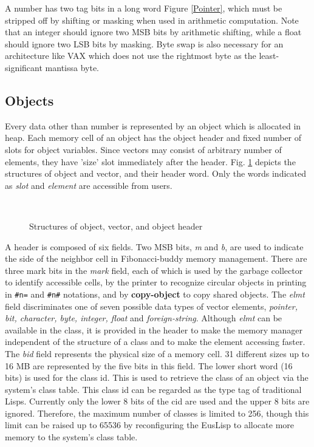 A number has two tag bits in a long word {Figure \ref{Pointer}},
which must be stripped off by shifting or masking 
when used in arithmetic computation.
Note that an integer should ignore two MSB bits by arithmetic shifting,
while a float should ignore two LSB bits by masking.
Byte swap is also necessary for an architecture like VAX which does not use
the rightmost byte as the least-significant mantissa byte.


\subsection{Objects}
Every data  other than number is represented by an object which is allocated
in heap. 
Each memory cell of an object has the object header and fixed number of 
slots for object variables.
Since vectors may consist of arbitrary number of elements,
they have 'size' slot immediately after the header.
Fig. \ref{ObjectFig} depicts the structures of object and vector, and their
header word.
Only the words indicated as {\em slot} and {\em element}
are accessible from users.

\begin{figure}[hbt]
\begin{center}
\mbox{
\epsfxsize=10cm
}
\end{center}
\caption{\label{ObjectFig}Structures of object, vector, and object header}
\end{figure}

A header is composed of six fields.
Two MSB bits, {\em m} and {\em b},
are used to indicate the side of the neighbor cell
in Fibonacci-buddy memory management.
There are three mark bits in the {\em mark} field, each of which
is used by the garbage collector to identify accessible cells,
by the printer to recognize circular objects in printing in {\tt \#n=} and
{\tt \#n\#} notations,
and by {\bf copy-object} to copy shared objects.
The {\em elmt} field discriminates one of seven possible data types
of vector elements, {\em pointer, bit, character, byte, integer, float}
and {\em foreign-string}.
Although {\em elmt} can be available in the class, 
it is provided in the header to make the memory manager independent of
the structure of a class and to make the element accessing faster.
The {\em bid} field represents the physical size of a memory cell.
31 different sizes up to 16 MB are represented by the five bits in this field.
The lower short word (16 bits) is used for the class id.
This is used to retrieve the class of an object via the system's class table.
This class id can be regarded as the type tag of traditional Lisps.
Currently only the lower 8 bits of the cid are used and the upper 8 bits
are ignored.
Therefore, the maximum number of classes is limited to 256, though
this limit can be raised up to 65536 by reconfiguring the EusLisp to allocate
more memory to the system's class table.

